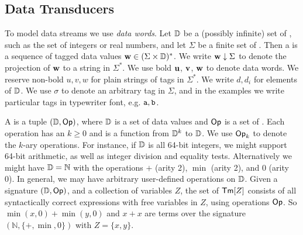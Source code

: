 \subsection{Data Transducers}
\label{dt:sec:model}
\label{dt:subsec:preliminaries}

To model data streams we use \emph{data words}.
Let $\mathbb{D}$ be a (possibly infinite) set of ,
such as the set of integers or real numbers,
and let $\Sigma$ be a finite set of .
Then a  is a sequence of tagged data values
$\textbf{w} \in (\Sigma \times \mathbb{D})^*$.
We write $\textbf{w} \downarrow \Sigma$ to denote
the projection of $\textbf{w}$ to a string in $\Sigma^*$.
We use bold $\textbf{u}$, $\textbf{v}$, $\textbf{w}$ to denote data words.
We reserve non-bold $u, v, w$ for plain strings of tags in $\Sigma^*$.
We write $d, d_i$ for elements of $\mathbb{D}$.
We use $\sigma$ to denote an arbitrary tag in $\Sigma$,
and in the examples we write particular tags in typewriter font, e.g. $\texttt{a}, \texttt{b}$.

A  is a tuple $(\mathbb{D}, \textsf{Op})$,
where $\mathbb{D}$ is a set of data values
and $\textsf{Op}$ is a set of .
Each operation has an  $k \ge 0$
and is a function from $\mathbb{D}^k$ to $\mathbb{D}$.
We use $\textsf{Op}_k$ to denote the $k$-ary operations.
For instance, if $\mathbb{D}$ is all 64-bit integers, we might support 64-bit arithmetic, as well as
integer division and equality tests.
Alternatively we might have $\mathbb{D} = \mathbb{N}$
with the operations $+$ (arity 2), $\min$ (arity 2), and $0$ (arity 0).
In general, we may have arbitrary user-defined operations on $\mathbb{D}$.
Given a signature $(\mathbb{D}, \textsf{Op})$,
and a collection of variables $Z$,
the set of  $\textsf{Tm}[Z]$
consists of all syntactically correct expressions
with free variables in $Z$, using operations $\textsf{Op}$.
So $\min(x,0) + \min(y,0)$ and $x + x$
are terms over the signature $(\mathbb{N}, \{+,\min,0\})$ with $Z = \{x,y\}$.

